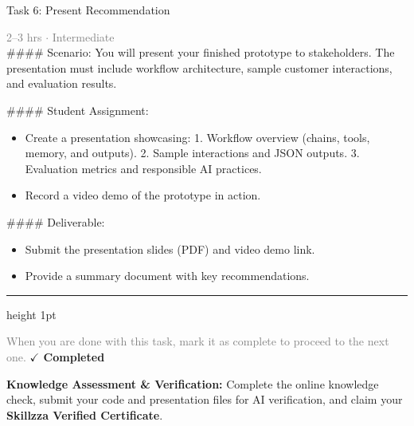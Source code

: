\documentclass[10pt,a4paper]{article}
\begin{document}
\begin{taskbox}{Task 6: Present Recommendation}

    {\small \textcolor{gray}{2--3 hrs $\cdot$ Intermediate}}\\[12pt]

    \#\#\#\# Scenario:
You will present your finished prototype to stakeholders. The presentation must include workflow architecture, sample customer interactions, and evaluation results.

\#\#\#\# Student Assignment:
\begin{itemize}
    \item Create a presentation showcasing:
  1. Workflow overview (chains, tools, memory, and outputs).
  2. Sample interactions and JSON outputs.
  3. Evaluation metrics and responsible AI practices.
    \item Record a video demo of the prototype in action.
\end{itemize}

\#\#\#\# Deliverable:
\begin{itemize}
    \item Submit the presentation slides (PDF) and video demo link.
    \item Provide a summary document with key recommendations.\par
\end{itemize}

    \vspace{16pt}

    \textcolor{cardBorder}{\hrule height 1pt}\vspace{8pt}

    \small \textcolor{gray}{When you are done with this task, mark it as complete to proceed to the next one.} \hfill \textbf{\textcolor{brandDark}{$\checkmark$ Completed}}

\end{taskbox}

\begin{completionbox}
    \textbf{Knowledge Assessment \& Verification:} Complete the online knowledge check, submit your code and presentation files for AI verification, and claim your \textbf{Skillzza Verified Certificate}.
\end{completionbox}

\newpage



\end{document}
